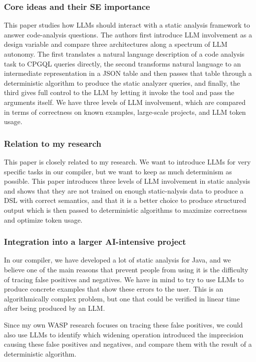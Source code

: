 \documentclass[11pt]{article}
\begin{document}
\subsubsection{Core ideas and their SE importance}
\label{sec:org48e9e76}
This paper studies how LLMs should interact with a static analysis framework to
answer code-analysis questions. The authors first introduce LLM involvement as a
design variable and compare three architectures along a spectrum of LLM
autonomy. The first translates a natural language description of a code analysis
task to CPGQL queries directly, the second transforms natural language to an
intermediate representation in a JSON table and then passes that table through a
deterministic algorithm to produce the static analyzer queries, and finally, the
third gives full control to the LLM by letting it invoke the tool and pass the
arguments itself. We have three levels of LLM involvement, which are compared in
terms of correctness on known examples, large-scale projects, and LLM token
usage.
\subsubsection{Relation to my research}
\label{sec:org85c6d31}
This paper is closely related to my research. We want to introduce LLMs for very
specific tasks in our compiler, but we want to keep as much determinism as
possible. This paper introduces three levels of LLM involvement in static
analysis and shows that they are not trained on enough static-nalysis data to
produce a DSL with correct semantics, and that it is a better choice to produce
structured output which is then passed to deterministic algorithms to maximize
correctness and optimize token usage.
\subsubsection{Integration into a larger AI-intensive project}
\label{sec:org376d309}
In our compiler, we have developed a lot of static analysis for Java, and we
believe one of the main reasons that prevent people from using it is the
difficulty of tracing false positives and negatives. We have in mind to try to
use LLMs to produce concrete examples that show these errors to the user. This
is an algorithmically complex problem, but one that could be verified in linear
time after being produced by an LLM.

Since my own WASP research focuses on tracing these false positives, we could
also use LLMs to identify which widening operation introduced the imprecision
causing these false positives and negatives, and compare them with the result of
a deterministic algorithm.
\end{document}

